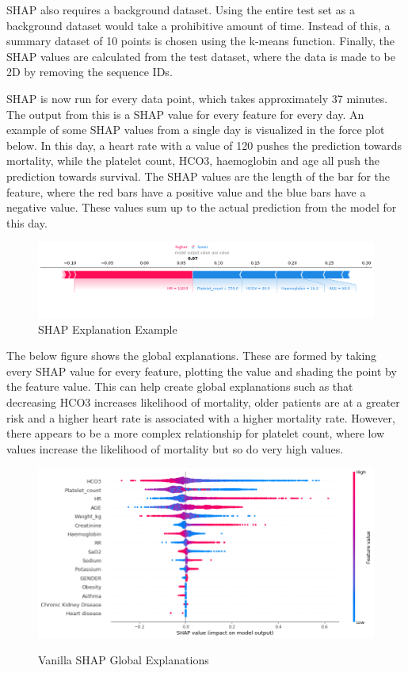 \documentclass[12pt]{article}
\begin{document}
SHAP also requires a background dataset. Using the entire test set as a background dataset would take a prohibitive amount of time. Instead of this, a summary dataset of 10 points is chosen using the k-means function. Finally, the SHAP values are calculated from the test dataset, where the data is made to be 2D by removing the sequence IDs. 

SHAP is now run for every data point, which takes approximately 37 minutes. The output from this is a SHAP value for every feature for every day. An example of some SHAP values from a single day is visualized in the force plot below. In this day, a heart rate with a value of 120 pushes the prediction towards mortality, while the platelet count, HCO3, haemoglobin and age all push the prediction towards survival. The SHAP values are the length of the bar for the feature, where the red bars have a positive value and the blue bars have a negative value. These values sum up to the actual prediction from the model for this day.

\begin{figure}[H]
\centering\caption{SHAP Explanation Example}
\includegraphics[scale=0.38]{SHAP individual explanation.png}
\end{figure}

The below figure shows the global explanations. These are formed by taking every SHAP value for every feature, plotting the value and shading the point by the feature value. This can help create global explanations such as that decreasing HCO3 increases likelihood of mortality, older patients are at a greater risk and a higher heart rate is associated with a higher mortality rate. However, there appears to be a more complex relationship for platelet count, where low values increase the likelihood of mortality but so do very high values.

\begin{figure}[H]
\centering\caption{Vanilla SHAP Global Explanations}
\includegraphics[scale=0.49]{Vanilla SHAP Global.png}
\label{Vanilla SHAP Global}
\end{figure}
\end{document}
